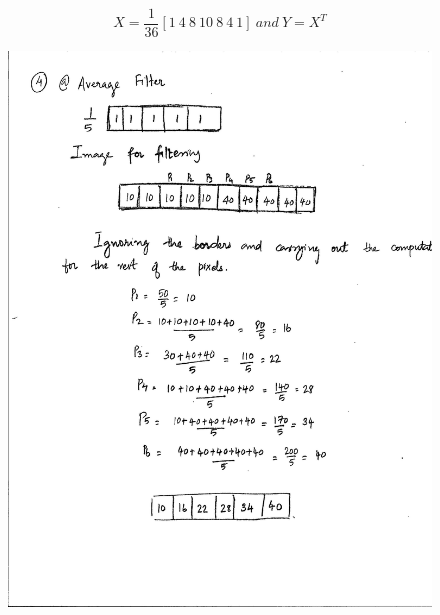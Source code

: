 \documentclass{article}
\begin{document}
\[
X = \frac{1}{36} [1\    4\     8\    10\    8\    4\    1]\ and\  Y = X^{T}
\]

\pagebreak

\begin{figure}
\includegraphics[width=15cm]{1.jpg}
\end{figure}
\end{document}
